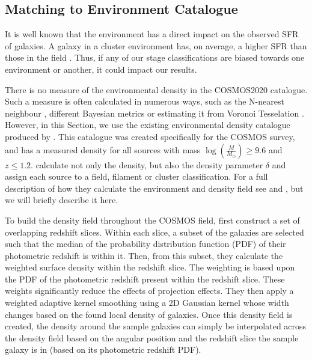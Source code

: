 \subsection{Matching to Environment Catalogue}\label{data:environ}
\noindent It is well known that the environment has a direct impact on the observed SFR of galaxies. A galaxy in a cluster environment has, on average, a higher SFR than those in the field \citep{2006MNRAS.373..469B}. Thus, if any of our stage classifications are biased towards one environment or another, it could impact our results.

There is no measure of the environmental density in the COSMOS2020 catalogue. Such a measure is often calculated in numerous ways, such as the N-nearest neighbour \citep{2006MNRAS.373..469B}, different Bayesian metrics \citep{2008ApJ...674L..13C} or estimating it from Voronoi Tesselation \citep{2021inas.book...57V}. However, in this Section, we use the existing environmental density catalogue produced by \citet{2017ApJ...837...16D}. This catalogue was created specifically for the COSMOS survey, and has a measured density for all sources with mass $\log(\frac{M}{M_\odot}) \geq 9.6$ and $z \leq 1.2$. \citet{2017ApJ...837...16D} calculate not only the density, but also the density parameter $\delta$ and assign each source to a field, filament or cluster classification. For a full description of how they calculate the environment and density field see \citet{2015ApJ...805..121D} and \citet{2017ApJ...837...16D}, but we will briefly describe it here.

To build the density field throughout the COSMOS field, \citet{2017ApJ...837...16D} first construct a set of overlapping redshift slices. Within each slice, a subset of the galaxies are selected such that the median of the probability distribution function (PDF) of their photometric redshift is within it. Then, from this subset, they calculate the weighted surface density within the redshift slice. The weighting is based upon the PDF of the photometric redshift present within the redshift slice. These weights significantly reduce the effects of projection effects. They then apply a weighted adaptive kernel smoothing using a 2D Gaussian kernel whose width changes based on the found local density of galaxies. Once this density field is created, the density around the sample galaxies can simply be interpolated across the density field based on the angular position and the redshift slice the sample galaxy is in (based on its photometric redshift PDF).

